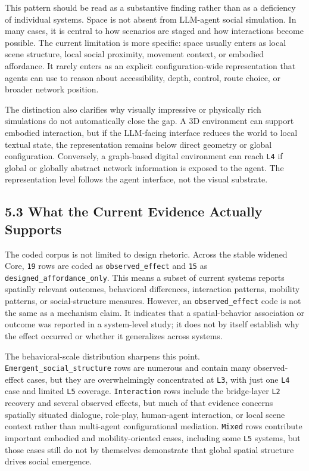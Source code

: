 \documentclass[
  twocolumn]{article}
\begin{document}
This pattern should be read as a substantive finding rather than as a
deficiency of individual systems. Space is not absent from LLM-agent
social simulation. In many cases, it is central to how scenarios are
staged and how interactions become possible. The current limitation is
more specific: space usually enters as local scene structure, local
social proximity, movement context, or embodied affordance. It rarely
enters as an explicit configuration-wide representation that agents can
use to reason about accessibility, depth, control, route choice, or
broader network position.

The distinction also clarifies why visually impressive or physically
rich simulations do not automatically close the gap. A 3D environment
can support embodied interaction, but if the LLM-facing interface
reduces the world to local textual state, the representation remains
below direct geometry or global configuration. Conversely, a graph-based
digital environment can reach \texttt{L4} if global or globally abstract
network information is exposed to the agent. The representation level
follows the agent interface, not the visual substrate.

\subsection{5.3 What the Current Evidence Actually
Supports}\label{what-the-current-evidence-actually-supports}

The coded corpus is not limited to design rhetoric. Across the stable
widened Core, \texttt{19} rows are coded as \texttt{observed\_effect}
and \texttt{15} as \texttt{designed\_affordance\_only}. This means a
subset of current systems reports spatially relevant outcomes,
behavioral differences, interaction patterns, mobility patterns, or
social-structure measures. However, an \texttt{observed\_effect} code is
not the same as a mechanism claim. It indicates that a spatial-behavior
association or outcome was reported in a system-level study; it does not
by itself establish why the effect occurred or whether it generalizes
across systems.

The behavioral-scale distribution sharpens this point.
\texttt{Emergent\_social\_structure} rows are numerous and contain many
observed-effect cases, but they are overwhelmingly concentrated at
\texttt{L3}, with just one \texttt{L4} case and limited \texttt{L5}
coverage. \texttt{Interaction} rows include the bridge-layer \texttt{L2}
recovery and several observed effects, but much of that evidence
concerns spatially situated dialogue, role-play, human-agent
interaction, or local scene context rather than multi-agent
configurational mediation. \texttt{Mixed} rows contribute important
embodied and mobility-oriented cases, including some \texttt{L5}
systems, but those cases still do not by themselves demonstrate that
global spatial structure drives social emergence.
\end{document}
